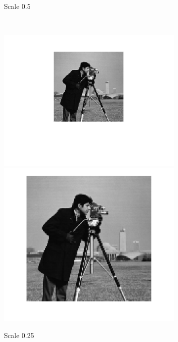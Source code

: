 \documentclass{article}
\begin{document}
\begin{figure}[h!]
\begin{subfigure}[t]{0.3\textwidth}
		\caption{Scale 0.5}
	\end{subfigure}%
	~
	\begin{subfigure}[t]{0.3\textwidth}
		\centering
		\includegraphics[width=\linewidth]{./output_images/DOWN_no_anti-alias_nearest_scale_0_250000.png}
		\includegraphics[width=\linewidth]{./output_images/UP_no_anti-alias_nearest_scale_0_250000.png}
		\caption{Scale 0.25}
	\end{subfigure}
	~
	\begin{subfigure}[t]{0.3\textwidth}
		\centering

\end{subfigure}
\end{figure}
\end{document}
